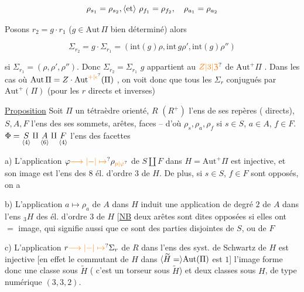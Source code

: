 \[
\rho_{s_1}=\rho_{s_2},\inserted{\text{et}}\ \rho_{f_1}=\rho_{f_2},\quad \rho_{a_1}=\rho_{a_2}
\]

 Posons $r_2=g\cdot r_1$ ($g\in\mathrm{Aut}\,\Pi$ bien déterminé) alors

\[
\Sigma_{r_2}=g\cdot\Sigma_{r_1}=
(\mathrm{int}(g)\rho,\mathrm{int}\,g\rho',\mathrm{int}(g)\rho'')
\]

si $\Sigma_{r_1}=(\rho,\rho',\rho'')$. Donc $\Sigma_{r_2}=\Sigma_{r_1}$  $g$ appartient au   $\unsure{Z|3|\mathfrak Z}$ de $\mathrm{Aut}^{+}\Pi$ . Dans les cas où $\mathrm{Aut}\,\Pi=Z\cdot\mathrm{Aut}^{\unsure{+|\epsilon}}(\Pi)$ , on voit donc que  tous les $\Sigma_r$ conjugués par $\mathrm{Aut}^{+}(\Pi)$ (pour les $r$ directs et inverses)


\uline{Proposition} Soit $\Pi$ un tétraèdre orienté, $R$ $(R^{+})$ l'ens de ses repères ( directs), $S,A,F$ l'ens des ses sommets, arêtes, faces -- d'où $\rho_s,\rho_a,\rho_f$ si $s\in S$, $a\in A$, $f\in F$.  $\Phi=\underset{\inserted{4}}S\amalg\underset{\inserted{6}}A\amalg\underset{\inserted{4}}F$ l'ens des facettes


a) L'application $\varphi\unsure{\longrightarrow|\mathord{-}|\mapsto}\rho_{\unsure{p|\varphi}}$ de $S\amalg F$ dans $H=\mathrm{Aut}^{+}\Pi$ est injective, et son image est l'ens des $8$ él. d'ordre $3$ de $H$. De plus, si $s\in S$, $f\in F$ sont opposés, on a 

b) L'application $a\longmapsto\rho_a$ de $A$ dans $H$ induit une application de degré $2$ de $A$ dans  l'ens $ {}_3H$ des él. d'ordre $3$ de $H$ [\uline{NB} deux arêtes sont dites opposées si elles ont $=$ image,  qui signifie aussi que ce sont des parties disjointes de $S$, ou de $F$\unsure{]|.}

c) L'application $r\unsure{\longrightarrow|\mathord{-}|\mapsto}\Sigma_r$ de $R$ dans l'ens des syst. de Schwartz de $H$ est injective [en effet le commutant de $H$ dans $\inserted{\widetilde H=}\mathrm{Aut}(\Pi)$ est $1$] l'image forme donc une classe sous $\widetilde H$ ( c'est un torseur sous $\widetilde H$) et deux classes sous $H$, de type numérique $(3,3,2)$.

